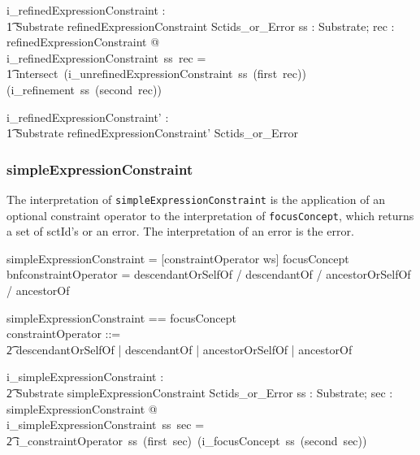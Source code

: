 \documentclass{article}
\def\spec#1{{\tt #1}}
\def\bnf#1{{\scriptsize {{#1}} }}
\begin{document}
\begin{gendef}
   i\_refinedExpressionConstraint : \\
\t1 Substrate \fun refinedExpressionConstraint \fun Sctids\_or\_Error
\where
   \forall ss : Substrate; rec : refinedExpressionConstraint @ \\
   i\_refinedExpressionConstraint~ss~rec = \\
\t1 intersect~(i\_unrefinedExpressionConstraint~ss~(first~rec)) (i\_refinement~ss~(second~rec))
\end{gendef}
\begin{gendef}

   i\_refinedExpressionConstraint' : \\
\t1 Substrate \fun refinedExpressionConstraint' \fun Sctids\_or\_Error
\end{gendef}




\subsubsection{simpleExpressionConstraint}
The interpretation of  \spec{simpleExpressionConstraint} is the application of an optional constraint 
operator to the interpretation of \spec{focusConcept}, which returns a set of sctId's or an error.
The interpretation of an error is the error.


\begin{framed}
\noindent
\bnf{simpleExpressionConstraint =  [constraintOperator ws] focusConcept} \\
bnf{constraintOperator = descendantOrSelfOf / descendantOf /  ancestorOrSelfOf / ancestorOf}
\end{framed}


\begin{zed}
simpleExpressionConstraint == \optional[constraintOperator] \cross focusConcept \\
constraintOperator ::= \\ 
\t2 descendantOrSelfOf | descendantOf | ancestorOrSelfOf | ancestorOf
\end{zed} 

\begin{gendef}
   i\_simpleExpressionConstraint : \\
\t2 Substrate \fun simpleExpressionConstraint \fun Sctids\_or\_Error
\where
   \forall ss : Substrate; sec : simpleExpressionConstraint @ \\
i\_simpleExpressionConstraint~ss~sec =  \\
\t2 i\_constraintOperator~ss~(first~sec)~(i\_focusConcept~ss~(second~sec))
\end{gendef}
\end{document}
